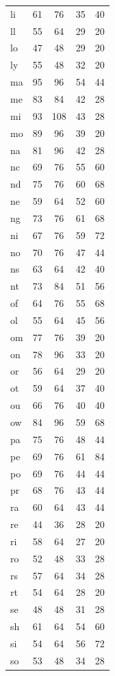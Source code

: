 \documentclass[ms,electronic,twosidetoc,letterpaper,chaptercenter,parttop,lof,lot]{byumsphd}
\begin{document}
\begin{table}
\begin{tabular}{| l | c c | c c |}
  li & 61 & 76 & 35 & 40 \\
  ll & 55 & 64 & 29 & 20 \\
  lo & 47 & 48 & 29 & 20 \\
  ly & 55 & 48 & 32 & 20 \\
  ma & 95 & 96 & 54 & 44 \\
  me & 83 & 84 & 42 & 28 \\
  mi & 93 & 108 & 43 & 28 \\
  mo & 89 & 96 & 39 & 20 \\
  na & 81 & 96 & 42 & 28 \\
  nc & 69 & 76 & 55 & 60 \\
  nd & 75 & 76 & 60 & 68 \\
  ne & 59 & 64 & 52 & 60 \\
  ng & 73 & 76 & 61 & 68 \\
  ni & 67 & 76 & 59 & 72 \\
  no & 70 & 76 & 47 & 44 \\
  ns & 63 & 64 & 42 & 40 \\
  nt & 73 & 84 & 51 & 56 \\
  of & 64 & 76 & 55 & 68 \\
  ol & 55 & 64 & 45 & 56 \\
  om & 77 & 76 & 39 & 20 \\
  on & 78 & 96 & 33 & 20 \\
  or & 56 & 64 & 29 & 20 \\
  ot & 59 & 64 & 37 & 40 \\
  ou & 66 & 76 & 40 & 40 \\
  ow & 84 & 96 & 59 & 68 \\
  pa & 75 & 76 & 48 & 44 \\
  pe & 69 & 76 & 61 & 84 \\
  po & 69 & 76 & 44 & 44 \\
  pr & 68 & 76 & 43 & 44 \\
  ra & 60 & 64 & 43 & 44 \\
  re & 44 & 36 & 28 & 20 \\
  ri & 58 & 64 & 27 & 20 \\
  ro & 52 & 48 & 33 & 28 \\
  rs & 57 & 64 & 34 & 28 \\
  rt & 54 & 64 & 28 & 20 \\
  se & 48 & 48 & 31 & 28 \\
  sh & 61 & 64 & 54 & 60 \\
  si & 54 & 64 & 56 & 72 \\
  so & 53 & 48 & 34 & 28 \\

\end{tabular}
\end{table}
\end{document}
